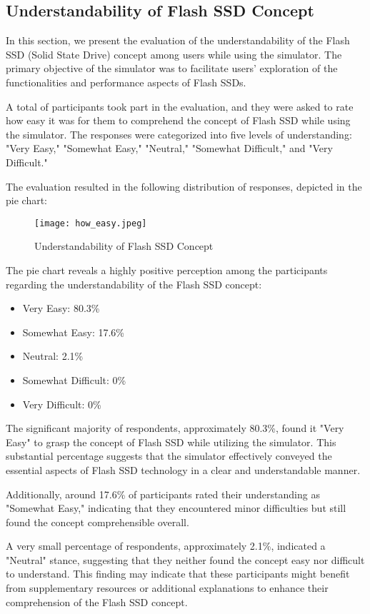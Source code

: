 \documentclass[conference]{/home/habib/Desktop/flash_ssd_simulator_web/paper_writing/latex_file/IEEEtran}
\begin{document}
\subsection{Understandability of Flash SSD Concept}
In this section, we present the evaluation of the understandability of the Flash SSD (Solid State Drive) concept among users while using the simulator. The primary objective of the simulator was to facilitate users' exploration of the functionalities and performance aspects of Flash SSDs.

A total of participants took part in the evaluation, and they were asked to rate how easy it was for them to comprehend the concept of Flash SSD while using the simulator. The responses were categorized into five levels of understanding: "Very Easy," "Somewhat Easy," "Neutral," "Somewhat Difficult," and "Very Difficult."

The evaluation resulted in the following distribution of responses, depicted in the pie chart:
\begin{figure}[h]
    \centering
    \texttt{[image: how\_easy.jpeg]}
    \caption{Understandability of Flash SSD Concept}
    \label{fig:enter-label}
\end{figure}
The pie chart reveals a highly positive perception among the participants regarding the understandability of the Flash SSD concept:
\begin{itemize}
    \item Very Easy: 80.3\%
    \item Somewhat Easy: 17.6\%
    \item Neutral: 2.1\%
    \item Somewhat Difficult: 0\%
    \item Very Difficult: 0\%
\end{itemize}
The significant majority of respondents, approximately 80.3\%, found it "Very Easy" to grasp the concept of Flash SSD while utilizing the simulator. This substantial percentage suggests that the simulator effectively conveyed the essential aspects of Flash SSD technology in a clear and understandable manner.

Additionally, around 17.6\% of participants rated their understanding as "Somewhat Easy," indicating that they encountered minor difficulties but still found the concept comprehensible overall.

A very small percentage of respondents, approximately 2.1\%, indicated a "Neutral" stance, suggesting that they neither found the concept easy nor difficult to understand. This finding may indicate that these participants might benefit from supplementary resources or additional explanations to enhance their comprehension of the Flash SSD concept.
\end{document}
